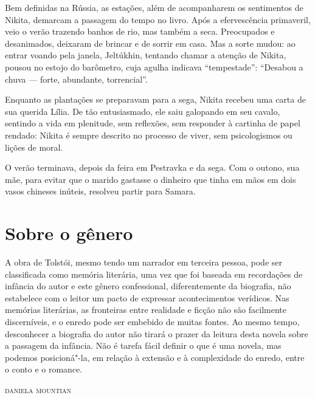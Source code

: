 Bem definidas na Rússia, as estações, além de acompanharem os
sentimentos de Nikita, demarcam a passagem do tempo no livro. Após a
efervescência primaveril, veio o verão trazendo banhos de rio, mas
também a seca. Preocupados e desanimados, deixaram de brincar e de
sorrir em casa. Mas a sorte mudou: ao entrar voando pela janela,
Jeltúkhin, tentando chamar a atenção de Nikita, pousou no estojo do
barômetro, cuja agulha indicava ``tempestade'': ``Desabou a chuva ---
forte, abundante, torrencial''.

Enquanto as plantações se preparavam para a sega, Nikita recebeu uma
carta de sua querida Lília. De tão entusiasmado, ele saiu galopando em
seu cavalo, sentindo a vida em plenitude, sem reflexões, sem responder à
cartinha de papel rendado: Nikita é sempre descrito no processo de
viver, sem psicologismos ou lições de moral.

O verão terminava, depois da feira em Pestravka e da sega. Com o outono,
sua mãe, para evitar que o marido gastasse o dinheiro que tinha em mãos
em dois vasos chineses inúteis, resolveu partir para Samara.


\section{Sobre o gênero}\label{para3}

\noindent{}A obra de Tolstói, mesmo tendo um narrador em terceira pessoa, pode ser
classificada como memória literária, uma vez que foi baseada em
recordações de infância do autor e este gênero confessional,
diferentemente da biografia, não estabelece com o leitor um pacto de
expressar acontecimentos verídicos. Nas memórias literárias, as
fronteiras entre realidade e ficção não são facilmente discerníveis, e o
enredo pode ser embebido de muitas fontes. Ao mesmo tempo, desconhecer
a biografia do autor não tirará o prazer da leitura desta novela sobre a
passagem da infância. Não é tarefa fácil definir o que é uma novela, mas
podemos posicioná"-la, em relação à extensão e à complexidade do enredo,
entre o conto e o romance.

\vfill

\begin{flushleft}
\textsc{daniela mountian}
\end{flushleft}


